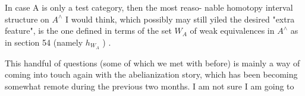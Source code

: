 In case A is only a test category,   then the most reaso-%
nable homotopy interval structure on $A^{\wedge}$ I would think,  which possibly
may still yiled the desired "extra feature",  is the one defined in 
\margin{$\lfloor$}terms of the set $W_{A}$  of weak equivalences in $A^{\wedge}$ as in section 54 (namely
$h_{W_{A}}$ ) .

\margin{$\lceil$}  This handful of questions (some of which we met with before) 
 is mainly a way of coming into touch again
with  the abelianization story,  which has been becoming somewhat
remote during the previous two months.  I am not sure I am going to

